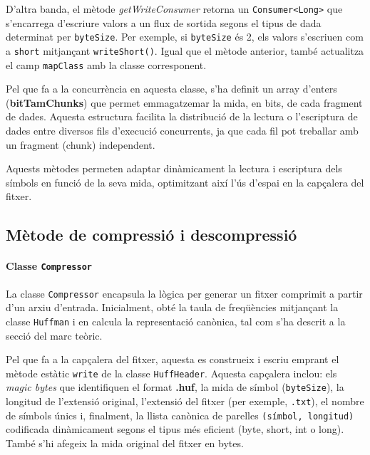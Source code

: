 \documentclass{ieeetj}
\begin{document}
D'altra banda, el mètode \textit{getWriteConsumer} retorna un \texttt{Consumer<Long>} que s'encarrega d'escriure valors a un flux de sortida segons el tipus de dada determinat per \texttt{byteSize}. Per exemple, si \texttt{byteSize} és 2, els valors s’escriuen com a \texttt{short} mitjançant \texttt{writeShort()}. Igual que el mètode anterior, també actualitza el camp \texttt{mapClass} amb la classe corresponent. \newline

Pel que fa a la concurrència en aquesta classe, s'ha definit un array d'enters (\textbf{bitTamChunks}) que permet emmagatzemar la mida, en bits, de cada fragment de dades. Aquesta estructura facilita la distribució de la lectura o l'escriptura de dades entre diversos fils d'execució concurrents, ja que cada fil pot treballar amb un fragment (chunk) independent.\newline

Aquests mètodes permeten adaptar dinàmicament la lectura i escriptura dels símbols en funció de la seva mida, optimitzant així l’ús d’espai en la capçalera del fitxer.


\subsection{Mètode de compressió i descompressió}

\paragraph{Classe \texttt{Compressor}} 

La classe \texttt{Compressor} encapsula la lògica per generar un fitxer comprimit a partir d’un arxiu d’entrada. Inicialment, obté la taula de freqüències mitjançant la classe \texttt{Huffman} i en calcula la representació canònica, tal com s’ha descrit a la secció del marc teòric. \newline

Pel que fa a la capçalera del fitxer, aquesta es construeix i escriu emprant el mètode estàtic \texttt{write} de la classe \texttt{HuffHeader}. Aquesta capçalera inclou: els \textit{magic bytes} que identifiquen el format \textbf{.huf}, la mida de símbol (\texttt{byteSize}), la longitud de l’extensió original, l’extensió del fitxer (per exemple, \texttt{.txt}), el nombre de símbols únics i, finalment, la llista canònica de parelles \texttt{(símbol, longitud)} codificada dinàmicament segons el tipus més eficient (byte, short, int o long). També s’hi afegeix la mida original del fitxer en bytes.\newline
\end{document}
